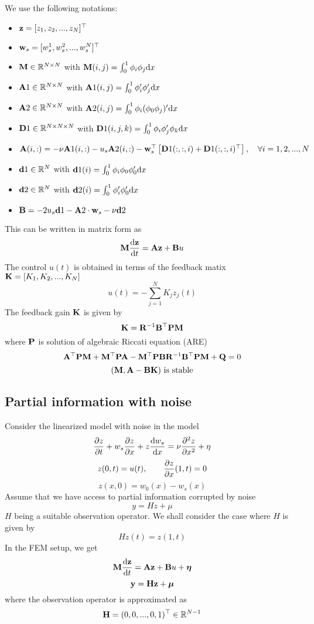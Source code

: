 \documentclass[12pt]{article}
\begin{document}
 We use the following notations:
\begin{itemize}
 \item ${\mathbf z} = [z_1,z_2,...,z_N]^\top$
 \item ${\mathbf w}_s = [w_s^1,w_s^2,...,w_s^N]^\top$
 \item ${\mathbf M} \in \mathbb{R}^{N \times N}$ with ${\mathbf M}(i,j) = \int_0^1 \phi_i\phi_j \textrm{d} x$
 \item ${\mathbf A}1 \in \mathbb{R}^{N \times N}$ with ${\mathbf A}1(i,j) = \int_0^1 \phi_i'\phi_j' \textrm{d} x$
 \item ${\mathbf A}2 \in \mathbb{R}^{N \times N}$ with ${\mathbf A}2(i,j) = \int_0^1 \phi_i(\phi_0 \phi_j)' \textrm{d} x$
 \item ${\mathbf D}1 \in \mathbb{R}^{N \times N \times N}$ with ${\mathbf D}1(i,j,k) = \int_0^1 \phi_i \phi_j' \phi_k \textrm{d} x$
 \item ${\mathbf A}(i,:) = - \nu {\mathbf A}1(i,:) -u_s {\mathbf A}2(i,:) - {\mathbf w}_s^\top \left[ {\mathbf D}1(:,:,i) + {\mathbf D}1(:,:,i)^\top \right], \quad \forall i = 1,2,...,N $
 \item ${\mathbf d}1 \in \mathbb{R}^{N}$ with ${\mathbf d}1(i) = \int_0^1 \phi_i \phi_0 \phi_0' \textrm{d} x$
 \item ${\mathbf d}2 \in \mathbb{R}^{N}$ with ${\mathbf d}2(i) = \int_0^1 \phi_i'\phi_0' \textrm{d} x$
 \item ${\mathbf B} = -2 u_s {\mathbf d}1 - {\mathbf A}2 \cdot {\mathbf w}_s - \nu {\mathbf d}2$
\end{itemize}
This can be written in matrix form as
\[
{\mathbf M} \frac{\textrm{d} {\mathbf z}}{\textrm{d} t} = {\mathbf A} {\mathbf z} + {\mathbf B} u
\]
The control $u(t)$ is obtained in terms of the feedback matix ${\mathbf K} = [K_1, K_2, ..., K_N]$ 
\[
 u(t) = - \sum_{j=1}^N K_j z_j(t)
\]
The feedback gain ${\mathbf K}$ is given by
\[
{\mathbf K} = {\mathbf R}^{-1} {\mathbf B}^\top {\mathbf P} {\mathbf M}
\]
where ${\mathbf P}$ is solution of algebraic Riccati equation (ARE)
\[
{\mathbf A}^\top {\mathbf P} {\mathbf M} + {\mathbf M}^\top {\mathbf P} {\mathbf A} - {\mathbf M}^\top {\mathbf P} {\mathbf B} {\mathbf R}^{-1} {\mathbf B}^\top {\mathbf P} {\mathbf M} + {\mathbf Q}  = 0
\]
\[
 ({\mathbf M},{\mathbf A} - {\mathbf B} {\mathbf K}) \text{ is stable} 
\]

\subsection{Partial information with noise}
Consider the linearized model with noise in the model
\begin{equation}
\frac{\partial z}{\partial t} + w_s \frac{\partial z}{\partial x} + z \frac{\textrm{d} w_s}{\textrm{d} x} = \nu \frac{\partial ^2 z}{\partial x^2} + \eta
\end{equation}
\begin{equation}
z(0,t) = u(t), \qquad \frac{\partial z}{\partial x}(1,t) = 0
\end{equation}
\begin{equation}
z(x,0) = w_0(x) - w_s(x)
\end{equation}
Assume that we have access to partial information corrupted by noise
\[
y = Hz + \mu
\]
$H$ being a suitable observation operator. We shall consider the case where $H$ is given by
\[
 Hz(t) = z(1,t)
\]
In the FEM setup, we get
\[
 {\mathbf M} \frac{\textrm{d} {\mathbf z}}{\textrm{d} t} = {\mathbf A} {\mathbf z} + {\mathbf B} u + \boldsymbol\eta 
\]
\[
 {\mathbf y} = {\mathbf H} {\mathbf z} + \boldsymbol\mu
\]
where the observation operator is approximated as
\[
 {\mathbf H} = (0,0,...,0,1)^\top \in \mathbb{R}^{N-1}
\]
\end{document}
